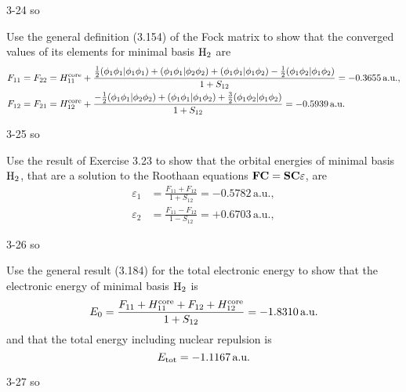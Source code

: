 \documentclass[a4paper]{book}
\newcommand{\core}{{\rm core}}
\newcommand{\C}{{\bf C}}
\newcommand{\F}{{\bf F}}
\newcommand{\SSS}{{\bf S}}
\begin{document}
	\begin{solution}
		3-24 so
	\end{solution}
	
	\begin{exercise}
	Use the general definition (3.154) of the Fock matrix to show that the converged values of its elements for minimal basis $\ce{H2}$ are
	\begin{align*}
		F_{11} &= F_{22} = H^\core_{11} + \frac{ \frac{1}{2} ( \phi_1 \phi_1 | \phi_1 \phi_1 ) + ( \phi_1 \phi_1 | \phi_2 \phi_2 ) + ( \phi_1 \phi_1 | \phi_1 \phi_2 ) - \frac{1}{2} ( \phi_1 \phi_2 | \phi_1 \phi_2 ) }{ 1+S_{12} }  = -0.3655 \, \text{a.u.} , \\
		F_{12} &= F_{21} = H^\core_{12} + \frac{ -\frac{1}{2} ( \phi_1 \phi_1 | \phi_2 \phi_2 ) + ( \phi_1 \phi_1 | \phi_1 \phi_2 ) + \frac{3}{2} ( \phi_1 \phi_2 | \phi_1 \phi_2 ) }{ 1+S_{12} }  = -0.5939 \, \text{a.u.}
	\end{align*}
	\end{exercise}
	
	\begin{solution}
		3-25 so
	\end{solution}
	
	\begin{exercise}
	Use the result of Exercise 3.23 to show that the orbital energies of minimal basis $\ce{H2}$, that are a solution to the Roothaan equations $\F\C=\SSS\C{\bf \varepsilon}$, are
	\begin{align*}
		\varepsilon_1 &= \frac{ F_{11} + F_{12} }{ 1 + S_{12} } = -0.5782 \, \text{a.u.} , \\
		\varepsilon_2 &= \frac{ F_{11} - F_{12} }{ 1 - S_{12} } = +0.6703 \, \text{a.u.} ,
	\end{align*}
	\end{exercise}
	
	\begin{solution}
		3-26 so
	\end{solution}
	
	\begin{exercise}
	Use the general result (3.184) for the total electronic energy to show that the electronic energy of minimal basis $\ce{H2}$ is
	\[
		E_0 = \frac{ F_{11} + H^\core_{11} + F_{12} + H^\core_{12} }{ 1 + S_{12} } = -1.8310 \, \text{a.u.}
	\]
	and that the total energy including nuclear repulsion is
	\[
		E_{\rm tot} = -1.1167 \, \text{a.u.}
	\]
	\end{exercise}
	
	\begin{solution}
		3-27 so
	\end{solution}
	
\end{document}
